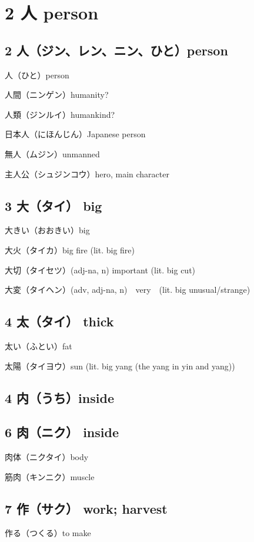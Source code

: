 \chapter{2 人 person}

\section{2 人（ジン、レン、ニン、ひと）person}

人（ひと）person

人間（ニンゲン）humanity?

人類（ジンルイ）humankind?

日本人（にほんじん）Japanese person

無人（ムジン）unmanned

主人公（シュジンコウ）hero, main character

\section{3 大（タイ） big}

大きい（おおきい）big

大火（タイカ）big fire (lit. big fire)

大切（タイセツ）(adj-na, n) important (lit. big cut)

大変（タイヘン）(adv, adj-na, n)　very　(lit. big unusual/strange)

\section{4 太（タイ） thick}

太い（ふとい）fat

太陽（タイヨウ）sun (lit. big yang (the yang in yin and yang))

\section{4 内（うち）inside}

\section{6 肉（ニク） inside}

肉体（ニクタイ）body

筋肉（キンニク）muscle

\section{7 作（サク） work; harvest}

作る（つくる）to make
